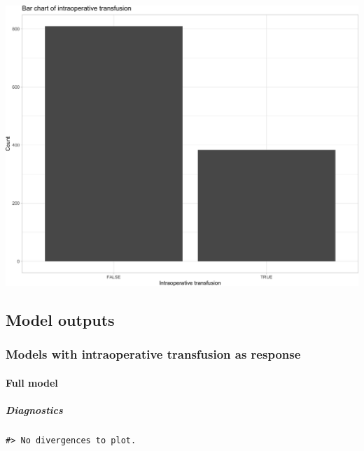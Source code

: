 \documentclass[
]{article}
\begin{document}
\begin{center}\includegraphics[width=1\linewidth]{notebook_files/figure-latex/data_plots-3} \end{center}

\hypertarget{model-outputs}{%
\subsection{Model outputs}\label{model-outputs}}

\hypertarget{models-with-intraoperative-transfusion-as-response}{%
\subsubsection{Models with intraoperative transfusion as response}\label{models-with-intraoperative-transfusion-as-response}}

\hypertarget{full-model}{%
\paragraph{Full model}\label{full-model}}

\hypertarget{diagnostics}{%
\subparagraph{Diagnostics}\label{diagnostics}}

\begin{verbatim}
#> No divergences to plot.
\end{verbatim}
\end{document}
